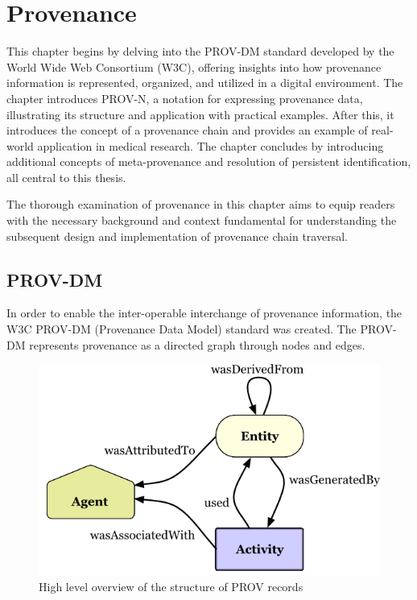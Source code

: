 \documentclass[
  digital,     %
  oneside,     %
  nosansbold,  %
  nocolorbold, %
  lof,         %
  lot,         %
]{fithesis4}
\begin{document}
\chapter{Provenance}
This chapter begins by delving into the PROV-DM standard developed by the World Wide Web Consortium (W3C), offering insights into how provenance information is represented, organized, and utilized in a digital environment. The chapter introduces PROV-N, a notation for expressing provenance data, illustrating its structure and application with practical examples. After this, it introduces the concept of a provenance chain and provides an example of real-world application in medical research. The chapter concludes by introducing additional concepts of meta-provenance and resolution of persistent identification, all central to this thesis.

The thorough examination of provenance in this chapter aims to equip readers with the necessary background and context fundamental for understanding the subsequent design and implementation of provenance chain traversal.

\section{PROV-DM} \label{provdm}
\shorthandoff{-}
In order to enable the inter-operable interchange of provenance information, the W3C PROV-DM (Provenance Data Model) standard was created. The PROV-DM represents provenance as a directed graph through nodes and edges.

\begin{figure}[htbp]
  \begin{center}
    \includegraphics[width=12.5cm]{fithesis/images/provdm-basics.png}
  \end{center}
  \caption{High level overview of the structure of PROV records \cite{provdm-basics}}
  \label{fig:provdm-basics}
\end{figure}
\end{document}
